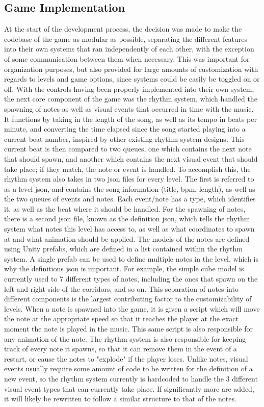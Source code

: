 \documentclass[10pt,twocolumn]{article}
\begin{document}
\subsection{Game Implementation}
At the start of the development process, the decision was made to make the codebase of the game as modular as possible, separating the different features into their own systems that ran independently of each other, with the exception of some communication between them when necessary. This was important for organization purposes, but also provided for large amounts of customization with regards to levels and game options, since systems could be easily be toggled on or off. With the controls having been properly implemented into their own system, the next core component of the game was the rhythm system, which handled the spawning of notes as well as visual events that occurred in time with the music. It functions by taking in the length of the song, as well as its tempo in beats per minute, and converting the time elapsed since the song started playing into a current beat number, inspired by other existing rhythm system designs\cite{RhythmUnity}. This current beat is then compared to two queues, one which contains the next note that should spawn, and another which contains the next visual event that should take place; if they match, the note or event is handled. To accomplish this, the rhythm system also takes in two json files for every level. The first is referred to as a level json, and contains the song information (title, bpm, length), as well as the two queues of events and notes. Each event/note has a type, which identifies it, as well as the beat where it should be handled. For the spawning of notes, there is a second json file, known as the definition json, which tells the rhythm system what notes this level has access to, as well as what coordinates to spawn at and what animation should be applied. The models of the notes are defined using Unity prefabs, which are defined in a list contained within the rhythm system. A single prefab can be used to define multiple notes in the level, which is why the definitions json is important. For example, the simple cube model is currently used to 7 different types of notes, including the ones that spawn on the left and right side of the corridors, and so on. This separation of notes into different components is the largest contributing factor to the customizability of levels. When a note is spawned into the game, it is given a script which will move the note at the appropriate speed so that it reaches the player at the exact moment the note is played in the music. This same script is also responsible for any animation of the note. The rhythm system is also responsible for keeping track of every note it spawns, so that it can remove them in the event of a restart, or cause the notes to "explode" if the player loses. Unlike notes, visual events usually require some amount of code to be written for the definition of a new event, so the rhythm system currently is hardcoded to handle the 3 different visual event types that can currently take place. If significantly more are added, it will likely be rewritten to follow a similar structure to that of the notes.
\end{document}

